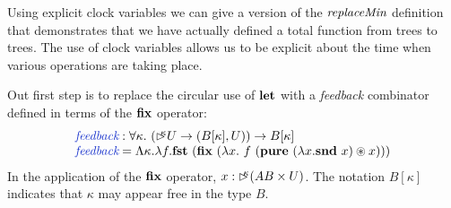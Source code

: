 Using explicit clock variables we can give a version of the
$\textit{replaceMin}$ definition that demonstrates that we have
actually defined a total function from trees to trees. The use of
clock variables allows us to be explicit about the time when various
operations are taking place.

Out first step is to replace the circular use of $\textbf{let}$ with a
\emph{feedback} combinator defined in terms of the $\textbf{fix}$
operator:
\begin{displaymath}
  \begin{array}{l}
    \defn{feedback} : \forall \kappa.~(\delay\kappa U \to (B[\kappa], U)) \to B[\kappa] \\
    \defn{feedback} = \Lambda \kappa. \lambda f. \kw{fst}~(\kw{fix}~(\lambda x.~f~(\kw{pure}~(\lambda x. \kw{snd}~x) \circledast x)))
  \end{array}
\end{displaymath}
In the application of the $\textbf{fix}$ operator, $x : \mathord{\rhd\kern-0.4em^{\kappa}} (A B
\times U)$.  The notation $B[\kappa]$ indicates that $\kappa$ may
appear free in the type $B$.


\newcommand{\hlchangem}[1]{\colorbox{greybg}{$#1$}}
\newcommand{\hlchange}[1]{\colorbox{greybg}{#1}}


